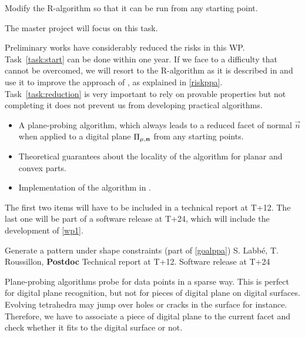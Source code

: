 \begin{Task}
  \label{task:start}
  Modify the R-algorithm so that it can be run from any starting point. 
\end{Task}

The master project will focus on this task. %

\Risks
Preliminary works have considerably reduced the risks in this WP. Task~\ref{task:start}
can be done within one year. If we face to a difficulty that cannot be overcomed,
we will resort to the R-algorithm as it is described in \cite{LPRJMIV2017} and use it
to improve the approach of \citeauthor*{Charrier2011} \cite{Charrier2011}, as explained
in \ref{riskppa}. Task~\ref{task:reduction} is very important to rely on provable
properties but not completing it does not prevent us from developing practical algorithms.

\Success
\begin{itemize}
    \item A plane-probing algorithm, which always leads to a
      reduced facet of normal $\vec{n}$ when applied to a digital
      plane $\Pi_{\mu,\mathbf{n}}$ from any starting points.
    \item Theoretical guarantees about the locality of the algorithm
      for planar and convex parts.   
    \item Implementation of the algorithm in \DGtal.   
\end{itemize}
The first two items will have to be included in a technical report at T+12.
The last one will be part of a software release at T+24, which will include
the development of \ref{wp1}. 

  

\medskip
{}
   {Generate a pattern under shape constraints (part of \ref{goalppa})}
   {S. Labb\'{e}, T. Roussillon, \textbf{Postdoc}}
   {Technical report at T+12. Software release at T+24}
\medskip

Plane-probing algorithms probe for data points in a sparse way.
This is perfect for digital plane recognition, but not for pieces
of digital plane on digital surfaces. Evolving tetrahedra may jump
over holes or cracks in the surface for instance. Therefore,
we have to associate a piece of digital plane
to the current facet and check whether it fits to the digital surface
or not.

